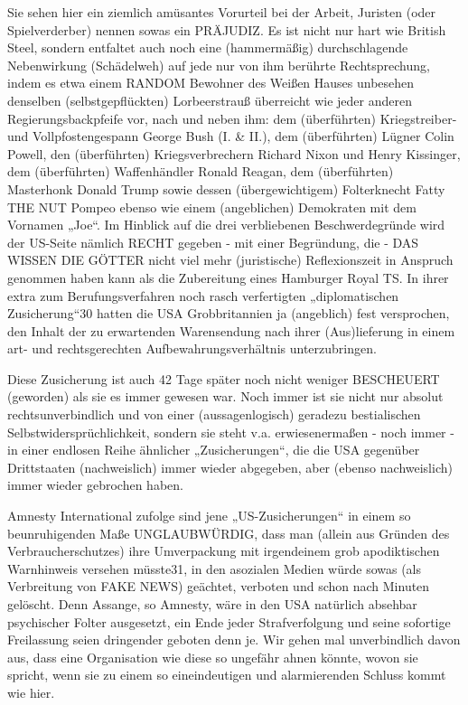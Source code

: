 \begin{multicols}{2}
Sie sehen hier ein ziemlich amüsantes Vorurteil bei der
Arbeit, Juristen (oder Spielverderber) nennen sowas ein
PRÄJUDIZ. Es ist nicht nur hart wie British Steel, sondern
entfaltet auch noch eine (hammermäßig) durchschlagende Nebenwirkung (Schädelweh) auf jede nur von ihm
berührte Rechtsprechung, indem es etwa einem RANDOM Bewohner des Weißen Hauses unbesehen denselben (selbstgepflückten) Lorbeerstrauß überreicht wie jeder anderen Regierungsbackpfeife vor, nach und neben
ihm: dem (überführten) Kriegstreiber- und Vollpfostengespann George Bush (I. \& II.), dem (überführten) Lügner Colin Powell, den (überführten) Kriegsverbrechern
Richard Nixon und Henry Kissinger, dem (überführten)
Waffenhändler Ronald Reagan, dem (überführten) Masterhonk Donald Trump sowie dessen (übergewichtigem)
Folterknecht Fatty THE NUT Pompeo ebenso wie einem
(angeblichen) Demokraten mit dem Vornamen „Joe“.
Im Hinblick auf die drei verbliebenen Beschwerdegründe wird der US-Seite nämlich RECHT gegeben - mit
einer Begründung, die - DAS WISSEN DIE GÖTTER nicht viel mehr (juristische) Reflexionszeit in Anspruch
genommen haben kann als die Zubereitung eines Hamburger Royal TS. In ihrer extra zum Berufungsverfahren noch rasch verfertigten „diplomatischen Zusicherung“30
hatten die USA Grobbritannien ja (angeblich) fest versprochen, den Inhalt der zu erwartenden Warensendung
nach ihrer (Aus)lieferung in einem art- und rechtsgerechten Aufbewahrungsverhältnis unterzubringen.

Diese Zusicherung ist auch 42 Tage später noch nicht
weniger BESCHEUERT (geworden) als sie es immer gewesen war. Noch immer ist sie nicht nur absolut rechtsunverbindlich und von einer (aussagenlogisch) geradezu bestialischen Selbstwidersprüchlichkeit, sondern
sie steht v.a. erwiesenermaßen - noch immer - in einer
endlosen Reihe ähnlicher „Zusicherungen“, die die USA
gegenüber Drittstaaten (nachweislich) immer wieder
abgegeben, aber (ebenso nachweislich) immer wieder
gebrochen haben.

Amnesty International zufolge sind jene „US-Zusicherungen“ in einem so beunruhigenden Maße UNGLAUBWÜRDIG, dass man (allein aus Gründen des Verbraucherschutzes) ihre Umverpackung mit irgendeinem
grob apodiktischen Warnhinweis versehen müsste31, in
den asozialen Medien würde sowas (als Verbreitung von
FAKE NEWS) geächtet, verboten und schon nach Minuten gelöscht. Denn Assange, so Amnesty, wäre in den
USA natürlich absehbar psychischer Folter ausgesetzt,
ein Ende jeder Strafverfolgung und seine sofortige Freilassung seien dringender geboten denn je. Wir gehen
mal unverbindlich davon aus, dass eine Organisation
wie diese so ungefähr ahnen könnte, wovon sie spricht,
wenn sie zu einem so eineindeutigen und alarmierenden Schluss kommt wie hier.


\end{multicols}
